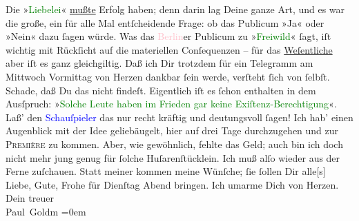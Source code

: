                Die »\textcolor{green}{Liebelei}{}\ledrightnote{\textcolor{green}{Liebelei. Schauspiel in drei Akten}}« \uline{mußte} Erfolg haben; denn {\pb}darin  lag Deine ganze Art, und es
               war die große, ein für alle Mal entſcheidende Frage:  ob das Publicum »Ja« oder »Nein« dazu ſagen würde. Was das \textcolor{pink}{Berlin}{}\ledrightnote{\textcolor{pink}{Berlin}}er Publicum zu »\textcolor{green}{Freiwild}{}\ledrightnote{\textcolor{green}{Freiwild. Schauspiel in 3 Akten}}« ſagt, iſt \strikeout{\textcolor{gray}{wig}} wichtig mit Rückſicht auf die materiellen Conſequenzen – für das \uline{Weſentliche} aber iſt es ganz gleichgiltig. Daß ich Dir
               trotzdem für ein Telegramm am Mittwoch{ }Vormittag von Herzen dankbar ſein werde, verſteht ſich von ſelbſt.\pend
           \pstart
           {\pb}Schade, daß Du das \label{K_L02789-3v}\label{K_L02789-3h} nicht findeſt.  Eigentlich iſt es  ſchon enthalten in dem Ausſpruch: »\textcolor{green}{Solche
               Leute haben im Frieden gar keine Exiſtenz-Berechtigung}{}«. Laß’ den \textcolor{blue}{Schauſpieler}{} das nur recht kräftig und
               deutungsvoll ſagen!\pend
           \pstart
           Ich hab’ einen Augenblick mit der Idee geliebäugelt, hier auf drei Tage durchzugehen
               und zur \textsc{Première} zu kommen. Aber, wie gewöhnlich, fehlte das
               Geld; auch bin ich doch nicht mehr jung genug für ſolche Huſarenſtücklein. Ich muß alſo wieder aus
               der Ferne zuſchauen. Statt meiner kommen meine Wünſche; ſie ſollen Dir alle{[}s{]} Liebe,
               Gute, Frohe für Dienſtag{ }Abend bringen. Ich umarme Dich von Herzen.\pend
           \pstart
           Dein treuer {\\[\baselineskip]}\spacefill\mbox{Paul Goldm}\pend
           \leftskip=0em{}\pstart
           \noindent{}\label{T_L02789-1v}\label{T_L02789-1h}\pend
           \endnumbering{}  
      